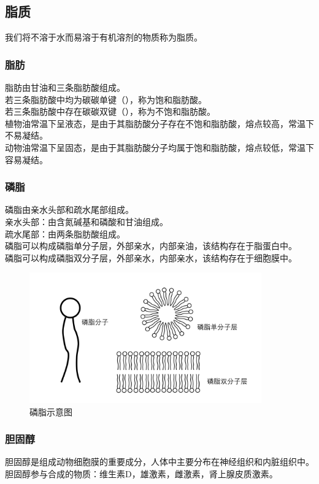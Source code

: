 \documentclass[UTF8]{ctexart}
\begin{document}
\subsection{脂质}
    我们将不溶于水而易溶于有机溶剂的物质称为脂质。

\subsubsection{脂肪}
    脂肪由甘油和三条脂肪酸组成。\\[3mm]
    若三条脂肪酸中均为碳碳单键（），称为饱和脂肪酸。\\[3mm]
    若三条脂肪酸中存在碳碳双键（），称为不饱和脂肪酸。\\[3mm]
    植物油常温下呈液态，是由于其脂肪酸分子存在不饱和脂肪酸，熔点较高，常温下不易凝结。\\[3mm]
    动物油常温下呈固态，是由于其脂肪酸分子均属于饱和脂肪酸，熔点较低，常温下容易凝结。

\subsubsection{磷脂}
    磷脂由亲水头部和疏水尾部组成。\\[3mm]
    亲水头部：由含氮碱基和磷酸和甘油组成。\\[3mm]
    疏水尾部：由两条脂肪酸组成。\\[3mm]
    磷脂可以构成磷脂单分子层，外部亲水，内部亲油，该结构存在于脂蛋白中。\\[3mm]
    磷脂可以构成磷脂双分子层，外部亲水，内部亲水，该结构存在于细胞膜中。
    \begin{figure}[h]
        \begin{center}
            \includegraphics[width=10cm]{BiologyImage/1.jpg}    
            \caption{磷脂示意图}
        \end{center}
    \end{figure}

\subsubsection{胆固醇}
    胆固醇是组成动物细胞膜的重要成分，人体中主要分布在神经组织和内脏组织中。\\[3mm]
    胆固醇参与合成的物质：维生素D，雄激素，雌激素，肾上腺皮质激素。
\end{document}
